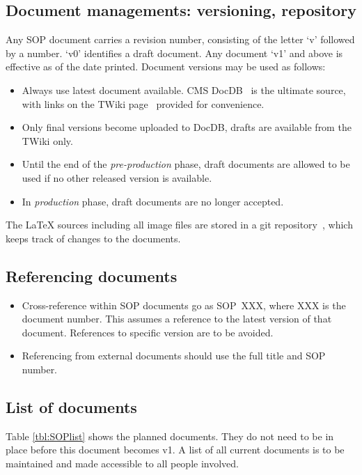 \documentclass[12pt]{unlsilabsop}
\begin{document}
\subsection{Document managements: versioning, repository}
Any SOP document carries a revision number, consisting of the letter `v' followed by a number. `v0' identifies a draft document. Any document `v1' and above is effective as of the date printed. Document versions may be used as follows:
\begin{itemize}
    \item Always use latest document available. CMS DocDB~\cite{SOPdocDB} is the ultimate source, with links on the TWiki page~\cite{UNLtwiki} provided for convenience.
    \item Only final versions become uploaded to DocDB, drafts are available from the TWiki only.
    \item Until the end of the \emph{pre-production} phase, draft documents are allowed to be used if no other released version is available.
    \item In \emph{production} phase, draft documents are no longer accepted.
\end{itemize}
The \LaTeX{} sources including all image files are stored in a git repository~\cite{SOPgit}, which keeps track of changes to the documents.

\subsection{Referencing documents}
\begin{itemize}
    \item Cross-reference within SOP documents go as SOP~XXX, where XXX is the document number. This assumes a reference to the latest version of that document. References to specific version are to be avoided.
    \item Referencing from external documents should use the full title and SOP number.
\end{itemize}

\subsection{List of documents}
Table \ref{tbl:SOPlist} shows the planned documents. They do not need to be in place before this document becomes v1. A list of all current documents is to be maintained and made accessible to all people involved.
\end{document}

